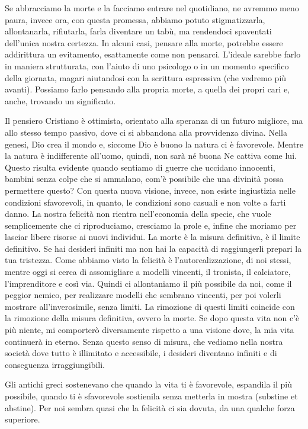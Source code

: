 \documentclass[12pt]{book} %
\begin{document}
Se abbracciamo la morte e la facciamo
entrare nel quotidiano, ne avremmo meno paura, invece ora, con questa promessa, abbiamo potuto stigmatizzarla,
allontanarla, rifiutarla, farla diventare un tabù, ma rendendoci spaventati dell'unica nostra
certezza.
In alcuni casi, pensare alla morte, potrebbe essere addirittura un evitamento, esattamente come non pensarci.
L'ideale sarebbe farlo in maniera strutturata, con l'aiuto di uno psicologo o in un momento specifico della giornata, magari aiutandosi con la scrittura espressiva (che vedremo più avanti). Possiamo farlo pensando alla propria morte, a quella dei propri cari e, anche, trovando un significato.

Il pensiero Cristiano è ottimista, orientato alla speranza di un futuro migliore, ma allo stesso tempo passivo, dove ci
si abbandona alla provvidenza divina. Nella genesi, Dio crea il mondo e, siccome Dio è buono la natura ci è favorevole.
Mentre la natura è indifferente all'uomo, quindi, non sarà né buona Ne cattiva come lui. 
Questo risulta evidente quando sentiamo di guerre che uccidano innocenti, bambini senza colpe che si ammalano, com'è possibile che una divinità possa permettere questo? Con questa nuova visione, invece, non
esiste ingiustizia nelle condizioni sfavorevoli, in quanto, le condizioni sono casuali e non volte a farti danno. La
nostra felicità non rientra nell'economia della specie, che vuole semplicemente che ci riproduciamo, cresciamo la prole
e, infine che moriamo per lasciar libere risorse ai nuovi individui. La morte è la misura definitiva, è il limite
definitivo. Se hai desideri infiniti ma non hai la capacità di raggiungerli prepari la tua tristezza. Come abbiamo
visto la felicità è l'autorealizzazione, di noi stessi, mentre oggi si cerca di assomigliare a
modelli vincenti, il tronista, il calciatore, l'imprenditore e così via. Quindi ci allontaniamo il
più possibile da noi, come il peggior nemico, per realizzare modelli che sembrano vincenti, per poi volerli mostrare
all'inverosimile, senza limiti. La rimozione di questi limiti coincide con la rimozione della misura definitiva, ovvero
la morte. Se dopo questa vita non c'è più niente, mi comporterò diversamente rispetto a una
visione dove, la mia vita continuerà in eterno. Senza questo senso di misura, che vediamo nella nostra società dove
tutto è illimitato e accessibile, i desideri diventano infiniti e di conseguenza irraggiungibili.

Gli antichi greci sostenevano che quando la vita ti è favorevole, espandila il più possibile, quando ti è sfavorevole
sostienila senza metterla in mostra (substine et abstine). Per noi sembra quasi che la felicità ci sia dovuta, da una
qualche forza superiore.
\end{document}
